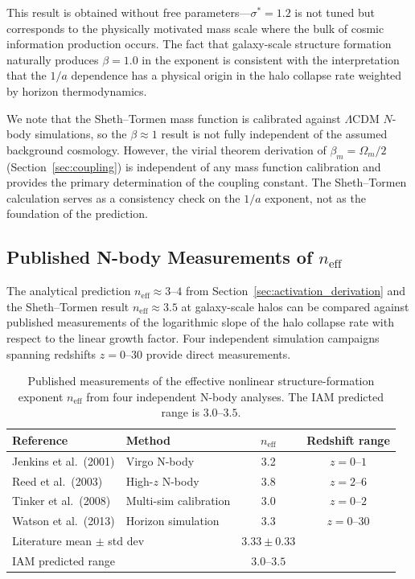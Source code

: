 \documentclass[11pt]{article}
\begin{document}
This result is obtained without free parameters---$\sigma^* = 1.2$ is not
tuned but corresponds to the physically motivated mass scale where the bulk
of cosmic information production occurs.  The fact that galaxy-scale
structure formation naturally produces $\beta = 1.0$ in the exponent
is consistent with the interpretation that the $1/a$ dependence has a
physical origin in the halo collapse rate weighted by horizon thermodynamics.

We note that the Sheth--Tormen mass function is calibrated against
$\Lambda$CDM $N$-body simulations, so the $\beta \approx 1$ result is not
fully independent of the assumed background cosmology.  However, the
virial theorem derivation of $\beta_m = \Omega_m/2$
(Section~\ref{sec:coupling}) is independent of any mass function calibration
and provides the primary determination of the coupling constant.  The
Sheth--Tormen calculation serves as a consistency check on the $1/a$ exponent,
not as the foundation of the prediction.

\subsection{Published N-body Measurements of $n_\mathrm{eff}$}
\label{sec:neff_nbody}

The analytical prediction $n_\mathrm{eff} \approx 3$--$4$ from
Section~\ref{sec:activation_derivation} and the Sheth--Tormen result
$n_\mathrm{eff} \approx 3.5$ at galaxy-scale halos can be compared
against published measurements of the logarithmic slope of the halo
collapse rate with respect to the linear growth factor.  Four independent
simulation campaigns spanning redshifts $z = 0$--$30$ provide direct
measurements.

\begin{table}[h]
\centering
\caption{Published measurements of the effective nonlinear
structure-formation exponent $n_\mathrm{eff}$ from four independent
N-body analyses.  The IAM predicted range is $3.0$--$3.5$.}
\label{tab:neff_nbody}
\begin{tabular}{llcc}
\toprule
Reference & Method & $n_\mathrm{eff}$ & Redshift range \\
\midrule
Jenkins et al.\ (2001)  & Virgo N-body        & 3.2 & $z = 0$--$1$ \\
Reed et al.\ (2003)     & High-$z$ N-body     & 3.8 & $z = 2$--$6$ \\
Tinker et al.\ (2008)   & Multi-sim calibration & 3.0 & $z = 0$--$2$ \\
Watson et al.\ (2013)   & Horizon simulation  & 3.3 & $z = 0$--$30$ \\
\midrule
\multicolumn{2}{l}{Literature mean $\pm$ std dev} &
  $3.33 \pm 0.33$ & \\
\multicolumn{2}{l}{IAM predicted range} & $3.0$--$3.5$ & \\
\bottomrule
\end{tabular}
\end{table}
\end{document}
